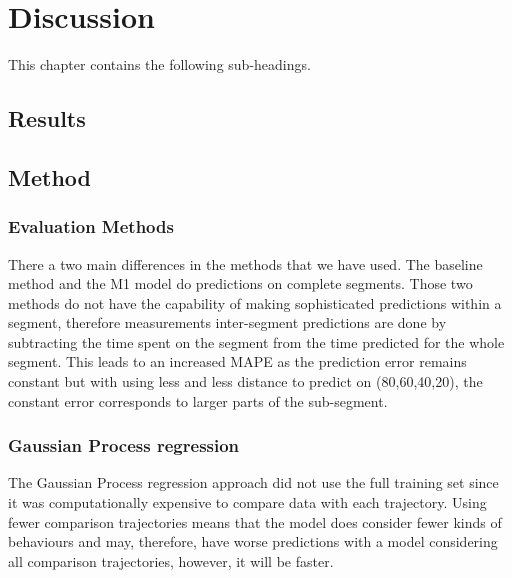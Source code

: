 
\chapter{Discussion}
\label{cha:discussion}

This chapter contains the following sub-headings.

\section{Results}
\label{sec:discussion-results}


\section{Method}
\label{sec:discussion-method}
\subsection{Evaluation Methods}
There a two main differences in the methods that we have used. The baseline method and the M1 model do predictions on complete segments. Those two methods do not have the capability of making sophisticated predictions within a segment, therefore measurements inter-segment predictions are done by subtracting the time spent on the segment from the time predicted for the whole segment. This leads to an increased MAPE as the prediction error remains constant but with using less and less distance to predict on (80,60,40,20), the constant error corresponds to larger parts of the sub-segment.

\subsection{Gaussian Process regression}
The Gaussian Process regression approach did not use the full training set since it was computationally expensive to compare data with each trajectory. Using fewer comparison trajectories means that the model does consider fewer kinds of behaviours and may, therefore, have worse predictions with a model considering all comparison trajectories, however, it will be faster.

